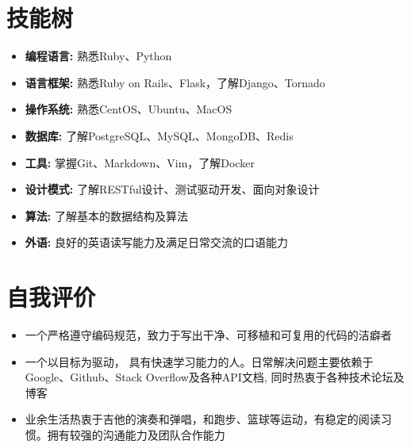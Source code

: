 \documentclass[11pt, a4paper,sans]{moderncv}     %
\begin{document}
\section{\yahei 技能树}
\begin{itemize}
  \item{\yahei \textbf{编程语言:} 熟悉Ruby、Python}
  \item{\yahei \textbf{语言框架:} 熟悉Ruby on Rails、Flask，了解Django、Tornado}
  \item{\yahei \textbf{操作系统:} 熟悉CentOS、Ubuntu、MacOS}
  \item{\yahei \textbf{数据库:} 了解PostgreSQL、MySQL、MongoDB、Redis}
  \item{\yahei \textbf{工具:} 掌握Git、Markdown、Vim，了解Docker}
  \item{\yahei \textbf{设计模式:} 了解RESTful设计、测试驱动开发、面向对象设计}
  \item{\yahei \textbf{算法:} 了解基本的数据结构及算法}
  \item{\yahei \textbf{外语:} 良好的英语读写能力及满足日常交流的口语能力}
\end{itemize}
\vspace{-8pt}

\section{\yahei 自我评价}

\begin{itemize}
  \item{\yahei 一个严格遵守编码规范，致力于写出干净、可移植和可复用的代码的洁癖者}
  \item{\yahei 一个以目标为驱动， 具有快速学习能力的人。日常解决问题主要依赖于Google、Github、Stack Overflow及各种API文档, 同时热衷于各种技术论坛及博客}
  \item{\yahei 业余生活热衷于吉他的演奏和弹唱，和跑步、篮球等运动，有稳定的阅读习惯。拥有较强的沟通能力及团队合作能力}
\end{itemize}
\end{document}
